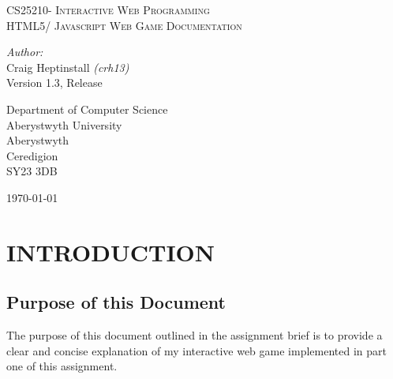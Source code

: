 \documentclass[a4paper]{article}
\begin{document}
\pagestyle{fancy}
\begin{center}
\textsc{\LARGE CS25210- Interactive Web Programming }\\
\vspace{10 mm}
\textsc{\LARGE HTML5/ Javascript Web Game Documentation}\\[0.5cm] %

\vspace{60 mm}
\begin{minipage}{0.8\textwidth}
\begin{flushleft} \large
\emph{Author:}\\
Craig Heptinstall \emph{(crh13)}\\
\vspace{10 mm}
Version 1.3, Release
\end{flushleft}
\end{minipage}
\vspace{80 mm}

\begin{minipage}{0.8\textwidth}
\begin{flushleft} \large
Department of Computer Science\\
Aberystwyth University\\
Aberystwyth\\
Ceredigion\\
SY23 3DB\\
\end{flushleft}
\end{minipage}
\vfill
{\large \today}
\end{center}
\clearpage
\setlength\parindent{0pt}


\tableofcontents
\clearpage


\section{INTRODUCTION}
\subsection{Purpose of this Document}
The purpose of this document outlined in the assignment brief is to provide a
clear and concise explanation of my interactive web game implemented in part one
of this assignment.
\end{document}
